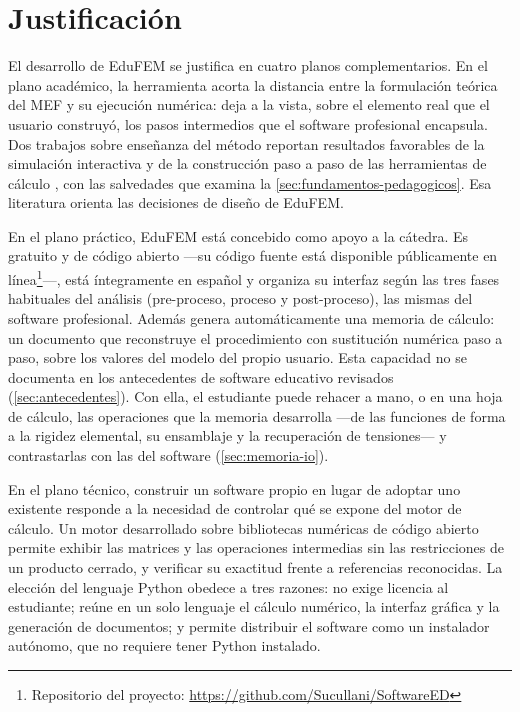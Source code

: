 \section*{Justificación}

El desarrollo de EduFEM se justifica en cuatro planos complementarios. En el plano académico, la herramienta acorta la distancia entre la formulación teórica del MEF y su ejecución numérica: deja a la vista, sobre el elemento real que el usuario construyó, los pasos intermedios que el software profesional encapsula. Dos trabajos sobre enseñanza del método reportan resultados favorables de la simulación interactiva y de la construcción paso a paso de las herramientas de cálculo \autocites[p.~168]{lee2015interactive}[p.~1023]{bishay2020teaching}, con las salvedades que examina la \autoref{sec:fundamentos-pedagogicos}. Esa literatura orienta las decisiones de diseño de EduFEM.

En el plano práctico, EduFEM está concebido como apoyo a la cátedra. Es gratuito y de código abierto —su código fuente está disponible públicamente en línea\footnote{Repositorio del proyecto: \url{https://github.com/Sucullani/SoftwareED}}—, está íntegramente en español y organiza su interfaz según las tres fases habituales del análisis (pre-proceso, proceso y post-proceso), las mismas del software profesional. Además genera automáticamente una memoria de cálculo: un documento que reconstruye el procedimiento con sustitución numérica paso a paso, sobre los valores del modelo del propio usuario. Esta capacidad no se documenta en los antecedentes de software educativo revisados (\autoref{sec:antecedentes}). Con ella, el estudiante puede rehacer a mano, o en una hoja de cálculo, las operaciones que la memoria desarrolla ---de las funciones de forma a la rigidez elemental, su ensamblaje y la recuperación de tensiones--- y contrastarlas con las del software (\autoref{sec:memoria-io}).

En el plano técnico, construir un software propio en lugar de adoptar uno existente responde a la necesidad de controlar qué se expone del motor de cálculo. Un motor desarrollado sobre bibliotecas numéricas de código abierto \autocite{harris2020numpy,virtanen2020scipy} permite exhibir las matrices y las operaciones intermedias sin las restricciones de un producto cerrado, y verificar su exactitud frente a referencias reconocidas. La elección del lenguaje Python obedece a tres razones: no exige licencia al estudiante; reúne en un solo lenguaje el cálculo numérico, la interfaz gráfica y la generación de documentos; y permite distribuir el software como un instalador autónomo, que no requiere tener Python instalado.


